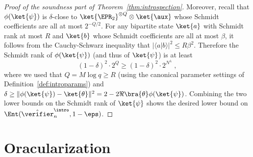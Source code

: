 \begin{proof}[Proof of the soundness part of Theorem~\ref{thm:introspection}]
  Moreover, recall that $\phi(\ket{\psi})$ is $\delta$-close to
  $\ket{\EPR_2}^{\otimes Q} \otimes \ket{\aux}$ whose Schmidt coefficients are
  all at most $2^{-Q/2}$.
  For any bipartite state $\ket{a}$ with Schmidt rank at most $R$ and $\ket{b}$
  whose Schmidt coefficients are all at most $\beta$, it follows from the
  Cauchy-Schwarz inequality that $|\langle a | b \rangle|^2 \leq R \beta^2$.
  Therefore the Schmidt rank of $\phi(\ket{\psi})$ (and thus of $\ket{\psi}$) is
  at least
  \[
  	\left (1 - \delta \right)^2 \cdot 2^{Q} \geq \left
      (1 - \delta \right)^2 \cdot 2^{N^\lambda}\;,
  \]
  where we used that $Q = M \log q \geq R$ (using the canonical parameter
  settings of Definition~\ref{def:introparams}) and $\delta \geq \|
  \phi(\ket{\psi}) - \ket{\theta} \|^2 = 2 - 2\Re \bra{\theta}
  \phi(\ket{\psi})$.
  Combining the two lower bounds on the Schmidt rank of $\ket{\psi}$ shows the
  desired lower bound on $\Ent(\tvint_n,1 - \eps)$.
\end{proof}

 
\section{Oracularization}
